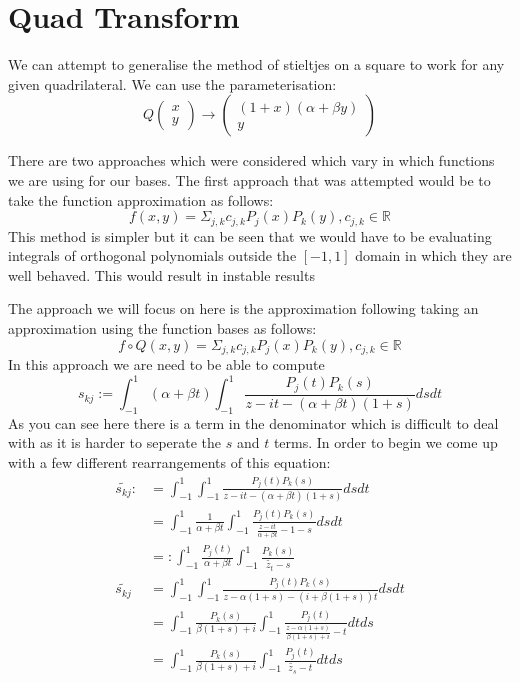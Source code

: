 \documentclass{article}
\begin{document}
\section{Quad Transform}
We can attempt to generalise the method of stieltjes on a square to work for any given quadrilateral. We can use the parameterisation: $$Q\begin{pmatrix}x\\y\end{pmatrix}\rightarrow
\begin{pmatrix}(1+x)(\alpha+\beta y)\\y\end{pmatrix}$$

There are two approaches which were considered which vary in which functions we are using for our bases.
The first approach that was attempted would be to take the function approximation as follows:
$$f(x,y)=\Sigma_{j,k}c_{j,k}P_j(x)P_k(y), c_{j,k}\in \mathbb{R}$$
This method is simpler but it can be seen that we would have to be evaluating integrals of orthogonal polynomials outside the
$[-1,1]$ domain in which they are well behaved.
This would result in instable results

The approach we will focus on here is the approximation following taking an approximation using the function bases as follows:
$$f\circ Q(x,y)= \Sigma_{j,k}c_{j,k}P_j(x)P_k(y), c_{j,k}\in \mathbb{R}$$
In this approach we are need to be able to compute $$s_{kj}:=\int_{-1}^1 (\alpha+\beta t) \int_{-1}^1 \frac{P_j(t)P_k(s)}
{z-it-(\alpha+\beta t)(1+s)} ds dt$$
As you can see here there is a term in the denominator which is difficult to deal with as it is harder to seperate the $s$ and $t$ terms.
In order to begin we come up with a few different rearrangements of this equation:
\begin{align}
\tilde{s_{kj}} :&= \int_{-1}^1 \int_{-1}^1 \frac{P_j(t)P_k(s)}
{z-it-(\alpha+\beta t)(1+s)} ds dt\\
&= \int_{-1}^1\frac{1}{\alpha+\beta t}\int_{-1}^1 \frac{P_j(t)P_k(s)}
{\frac{z-it}{\alpha+\beta t}-1-s}dsdt\\
&=: \int_{-1}^1\frac{P_j(t)}{\alpha+\beta t}\int_{-1}^1 \frac{P_k(s)}{\tilde{z_t}-s} \\
\tilde{s_{kj}} &= \int_{-1}^1\int_{-1}^1
\frac{P_j(t)P_k(s)}{z-\alpha(1+s)-(i+\beta(1+s))t}dsdt \\
&= \int_{-1}^1\frac{P_k(s)}{\beta(1+s)+i}\int_{-1}^1 \frac{P_j(t)}{
	\frac{z-\alpha(1+s)}{\beta(1+s)+i}-t}dtds\\
&= \int_{-1}^1\frac{P_k(s)}{\beta(1+s)+i}\int_{-1}^1 \frac{P_j(t)}{
\tilde{z_s}-t}dtds\\
\end{align}
\end{document}
